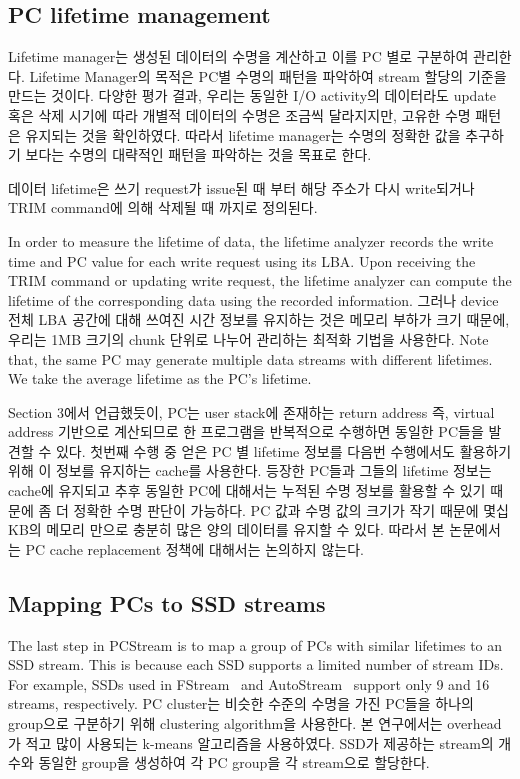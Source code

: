 \subsection{PC lifetime management}
{\color{blue}Lifetime manager는 생성된 데이터의 수명을 계산하고 이를 PC 별로 구분하여 관리한다.
Lifetime Manager의 목적은 PC별 수명의 패턴을 파악하여 stream 할당의 기준을 만드는 것이다.
다양한 평가 결과, 우리는 동일한 I/O activity의 데이터라도 update 혹은 삭제 시기에 따라
개별적 데이터의 수명은 조금씩 달라지지만, 고유한 수명 패턴은 유지되는 것을 확인하였다.
따라서 lifetime manager는 수명의 정확한 값을 추구하기 보다는 수명의 대략적인 패턴을 파악하는 것을 목표로 한다.

데이터 lifetime은 쓰기 request가 issue된 때 부터 해당 주소가 다시 write되거나 
TRIM command에 의해 삭제될 때 까지로 정의된다.}
In order to measure the lifetime of data, the lifetime analyzer 
records the write time and PC value for each write request using its LBA.
Upon receiving the TRIM command or updating write request, the lifetime analyzer can compute the 
lifetime of the corresponding data using the recorded information.
{\color{blue} 
그러나 device 전체 LBA 공간에 대해 쓰여진 시간 정보를 유지하는 것은 메모리 부하가 크기 때문에,
우리는 1MB 크기의 chunk 단위로 나누어 관리하는 최적화 기법을 사용한다.
}
Note that, the
same PC may generate multiple data streams with different lifetimes.
We take the average lifetime as the PC's lifetime.

{\color{blue} Section 3에서 언급했듯이, PC는 user stack에 존재하는 
return address 즉, virtual address 기반으로 계산되므로
한 프로그램을 반복적으로 수행하면 동일한 PC들을 발견할 수 있다.
첫번째 수행 중 얻은 PC 별 lifetime 정보를 다음번 수행에서도 활용하기 위해 
이 정보를 유지하는 cache를 사용한다.
등장한 PC들과 그들의 lifetime 정보는 cache에 유지되고 추후 동일한 PC에 대해서는 
누적된 수명 정보를 활용할 수 있기 때문에 좀 더 정확한 수명 판단이 가능하다.
PC 값과 수명 값의 크기가 작기 때문에 몇십 KB의 메모리 만으로 충분히 많은 양의 데이터를 
유지할 수 있다. 따라서 본 논문에서는 PC cache replacement 정책에 대해서는 논의하지 않는다.
}

\subsection{Mapping PCs to SSD streams}

The last step in \textsf{\small PCStream} is to map
a group of PCs with similar lifetimes to an SSD stream.
This is because each SSD supports a limited number of stream IDs. For
example, SSDs used in \textsf{\small FStream}~\cite{FStream} and \textsf{\small AutoStream}~\cite{AutoStream}
support only 9 and 16 streams, respectively. 
{\color{blue} PC cluster는 비슷한 수준의 수명을 가진 PC들을 하나의 group으로 구분하기 위해 clustering algorithm을 사용한다.
본 연구에서는 overhead가 적고 많이 사용되는 k-means 알고리즘을 사용하였다.
SSD가 제공하는 stream의 개수와 동일한 group을 생성하여 각 PC group을 각 stream으로 할당한다.
}

